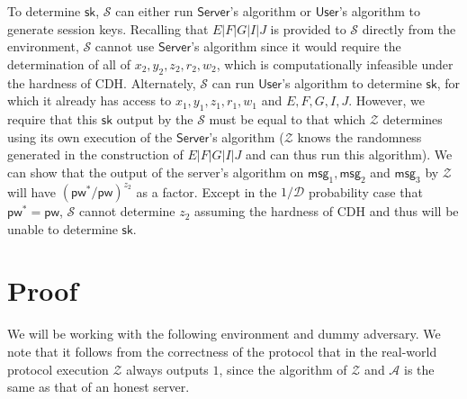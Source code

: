 \documentclass[12pt,a4paper]{article}
\newcommand{\simulator}{\mathcal{S}}
\newcommand{\env}{\mathcal{Z}}
\newcommand{\adv}{\mathcal{A}}
\newcommand{\user}{\mathsf{User}}
\newcommand{\sk}{\mathsf{sk}}
\newcommand{\pw}{\mathsf{pw}}
\newcommand{\server}{\mathsf{Server}}
\newcommand{\msg}[1]{\mathsf{msg}_{#1}}
\begin{document}
	To determine $\sk$, $\simulator$ can either run $\server$'s algorithm or $\user$'s algorithm to generate session keys. Recalling that $E|F|G|I|J$ is provided to $\simulator$ directly from the environment, $\simulator$ cannot use $\server$'s algorithm since it would require the determination of all of $x_2, y_2, z_2, r_2, w_2$, which is computationally infeasible under the hardness of CDH. Alternately, $\simulator$ can run $\user$'s algorithm to determine $\sk$, for which it already has access to $x_1,y_1,z_1,r_1,w_1$ and $E,F,G,I,J$. However, we require that this $\sk$ output by the $\simulator$ must be equal to that which $\env$ determines using its own execution of the $\server$'s algorithm ($\env$ knows the randomness generated in the construction of $E|F|G|I|J$ and can thus run this algorithm). We can show that the output of the server's algorithm on $\msg{1},\msg{2}$ and $\msg{3}$ by $\env$ will have $(\pw^{*}/\pw)^{z_2}$ as a factor. Except in the $1/\mathcal{D}$ probability case that $\pw^{*}=\pw$, $\simulator$ cannot determine $z_2$ assuming the hardness of CDH and thus will be unable to determine $\sk$.\\
	
	\section{Proof}
	
	We will be working with the following environment and dummy adversary. We note that it follows from the correctness of the protocol that in the real-world protocol execution $\env$ always outputs $1$, since the algorithm of $\env$ and $\adv$ is the same as that of an honest server.\\
	
\end{document}
